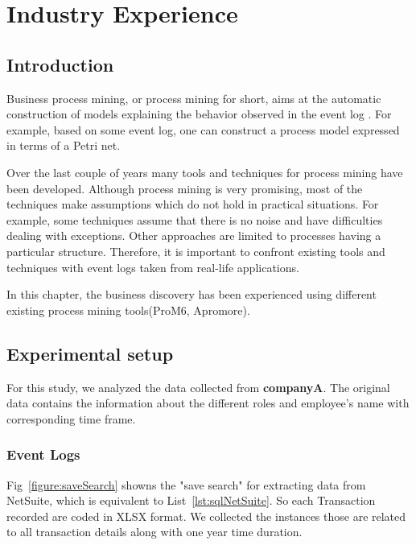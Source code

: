 \chapter{Industry Experience}
\label{chap:industryExperience}

\section{Introduction}
\label{sec:industryExperience-Introduction}

Business process mining, or process mining for short, aims at the automatic construction of models explaining the behavior observed in the event log \cite{maita2015process}. For example, based on some event log, one can construct a process model expressed in terms of a Petri net.

Over the last couple of years many tools and techniques for process mining have been developed\cite{rozinat2006decision}\cite{}. Although process mining is very promising, most of the techniques make assumptions which do not hold in practical situations. For example, some techniques assume that there is no noise and have difficulties dealing with exceptions. Other approaches are limited to processes having a particular structure. Therefore, it is important to confront existing tools and techniques with event logs taken from real-life applications.

In this chapter, the business discovery has been experienced using different existing process mining tools(ProM6, Apromore).

\section{Experimental setup}
\label{sec:industryExperience-Methodology}
For this study, we analyzed the data collected from  \textbf{companyA}. 
The original data contains the information about the different roles and employee's name with corresponding time frame.


\subsection{Event Logs}

Fig~\ref{figure:saveSearch} showns the "save search" for extracting data from NetSuite, which is equivalent to List~\ref{lst:sqlNetSuite}. 
So each Transaction recorded are coded in XLSX format. We collected the instances those are related to all transaction details along with one year time duration. 


